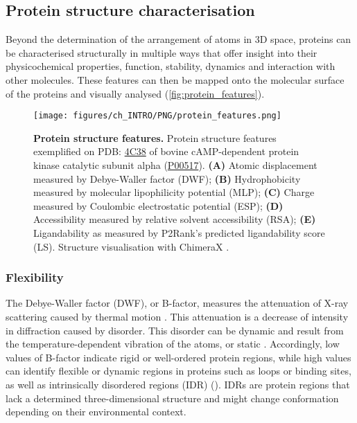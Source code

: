 \subsection{Protein structure characterisation}

Beyond the determination of the arrangement of atoms in 3D space, proteins can be characterised structurally in multiple ways that offer insight into their physicochemical properties, function, stability, dynamics and interaction with other molecules. These features can then be mapped onto the molecular surface of the proteins and visually analysed (\autoref{fig:protein_features}).

\begin{figure}[htb!]
    \centering
    \texttt{[image: figures/ch\_INTRO/PNG/protein\_features.png]}
    \caption[Protein structure features]{\textbf{Protein structure features.} Protein structure features exemplified on PDB: \href{https://www.ebi.ac.uk/pdbe/entry/pdb/4c38}{4C38} \cite{COUTY_2013_ONCO} of bovine cAMP-dependent protein kinase catalytic subunit alpha (\href{https://www.uniprot.org/uniprotkb/P00517/entry}{P00517}). \textbf{(A)} Atomic displacement measured by Debye-Waller factor (DWF); \textbf{(B)} Hydrophobicity measured by molecular lipophilicity potential (MLP); \textbf{(C)} Charge measured by Coulombic electrostatic potential (ESP); \textbf{(D)} Accessibility measured by relative solvent accessibility (RSA); \textbf{(E)} Ligandability as measured by P2Rank's predicted ligandability score (LS). Structure visualisation with ChimeraX \cite{PETTERSEN_2021_CHIMERAX}.}
    \label{fig:protein_features}
\end{figure}

\subsubsection{Flexibility}

The Debye-Waller factor (DWF), or B-factor, measures the attenuation of X-ray scattering caused by thermal motion \cite{DEBYE_1913_BFACTOR, WALLER_1923_BFACTOR}. This attenuation is a decrease of intensity in diffraction caused by disorder. This disorder can be dynamic and result from the temperature-dependent vibration of the atoms, or static \cite{SUN_2019_BFACTOR}. Accordingly, low values of B-factor indicate rigid or well-ordered protein regions, while high values can identify flexible or dynamic regions in proteins such as loops or binding sites, as well as intrinsically disordered regions (IDR) (). IDRs are protein regions that lack a determined three-dimensional structure and might change conformation depending on their environmental context.


